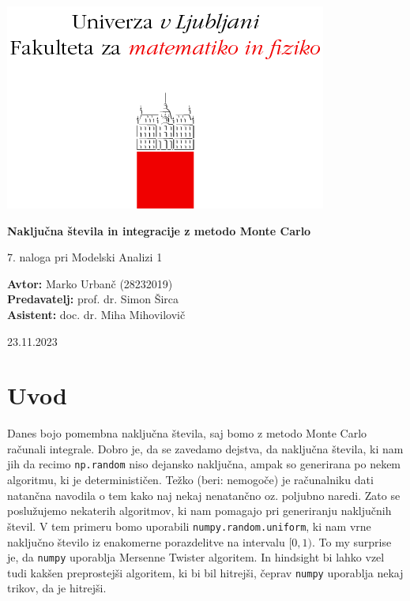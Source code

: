 \documentclass[a4paper]{article}
\begin{document}
\begin{titlepage}
    \begin{center}
        \includegraphics[]{logo.png}
        \vspace*{3cm}
        
        \Huge
        \textbf{Naključna števila in integracije z metodo Monte Carlo}
        
        \vspace{0.5cm}
        \large
        7. naloga pri Modelski Analizi 1

        \vspace{4.5cm}
        
        \textbf{Avtor:} Marko Urbanč (28232019)\ \\
        \textbf{Predavatelj:} prof. dr. Simon Širca\ \\
        \textbf{Asistent:} doc. dr. Miha Mihovilovič\ \\
        
        \vspace{1.8cm}
        
        \large
        23.11.2023
    \end{center}
\end{titlepage}
\tableofcontents
\newpage
\section{Uvod}
Danes bojo pomembna naključna števila, saj bomo z metodo Monte Carlo računali integrale. 
Dobro je, da se zavedamo dejstva, da naključna števila, ki nam jih da recimo \texttt{np.random}
niso dejansko naključna, ampak so generirana po nekem algoritmu, ki je determinističen. Težko (beri: nemogoče) je
računalniku dati natančna navodila o tem kako naj nekaj nenatančno oz. poljubno naredi. Zato se poslužujemo
nekaterih algoritmov, ki nam pomagajo pri generiranju naključnih števil. V tem primeru bomo uporabili
\texttt{numpy.random.uniform}, ki nam vrne naključno število iz enakomerne porazdelitve na intervalu $[0,1)$.
To my surprise je, da \texttt{numpy} uporablja Mersenne Twister algoritem. In hindsight bi lahko vzel tudi kakšen 
preprostejši algoritem, ki bi bil hitrejši, čeprav \texttt{numpy} uporablja nekaj trikov, da je hitrejši.
\end{document}

